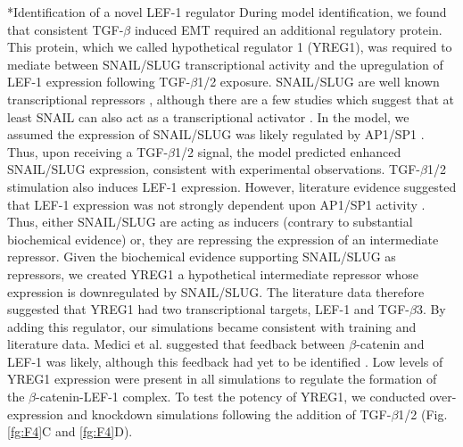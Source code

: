 \documentclass[12pt]{article}
\makeatletter
\renewcommand\subsection{\@startsection
	{subsection}{2}{0mm}
	{-0.05in}
	{-0.5\baselineskip}
	{\normalfont\normalsize\bfseries}}
\makeatother
\begin{document}
\subsection*{Identification of a novel LEF-1 regulator}
During model identification, we found that consistent TGF-$\beta$ induced EMT required an additional regulatory protein.
This protein, which we called hypothetical regulator 1 (YREG1), was required to mediate between SNAIL/SLUG transcriptional activity
and the upregulation of LEF-1 expression following TGF-$\beta$1/2 exposure.
SNAIL/SLUG are well known transcriptional repressors \citep{Hemavathy:2000aa,Hemavathy:2000ab,Dhasarathy:2011aa}, although there are a few studies
which suggest that at least SNAIL can also act as a transcriptional activator \citep{Guaita:2002aa}.
In the model, we assumed the expression of SNAIL/SLUG was likely regulated by AP1/SP1 \citep{Jackstadt:2013aa}.
Thus, upon receiving a TGF-$\beta$1/2 signal, the model predicted enhanced SNAIL/SLUG expression, consistent with experimental observations.
TGF-$\beta$1/2 stimulation also induces LEF-1 expression. However, literature evidence suggested that LEF-1 expression was not strongly dependent upon AP1/SP1 activity \citep{Eastman:1999aa}.
Thus, either SNAIL/SLUG are acting as inducers (contrary to substantial biochemical evidence) or, they are repressing the expression of an intermediate repressor.
Given the biochemical evidence supporting SNAIL/SLUG as repressors, we created YREG1 a hypothetical intermediate repressor whose
expression is downregulated by SNAIL/SLUG. The literature data therefore suggested that YREG1 had two transcriptional targets, LEF-1 and TGF-$\beta$3.
By adding this regulator, our simulations became consistent with training and literature data.
Medici et al. suggested that feedback between $\beta$-catenin and LEF-1 was likely, although this feedback had yet to be identified \citep{Medici:2008fk}.
Low levels of YREG1 expression were present in all simulations to regulate the formation of the $\beta$-catenin-LEF-1 complex.
To test the potency of YREG1, we conducted over-expression and knockdown simulations following the addition of TGF-$\beta$1/2 (Fig. \ref{fg:F4}C and \ref{fg:F4}D).

\end{document}
